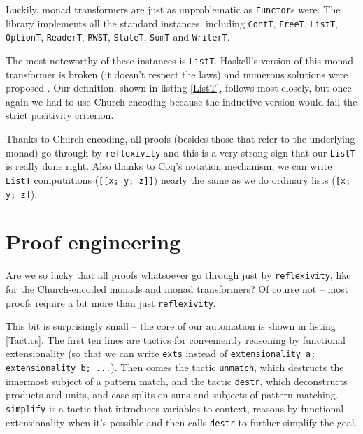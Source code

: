 \documentclass[declaration,inz,english,shortabstract]{iithesis}
\newcommand{\m}[1]{\texttt{#1}}
\begin{document}
Luckily, monad transformers are just as unproblematic as \m{Functor}s were. The library implements all the standard instances, including \m{ContT}, \m{FreeT}, \m{ListT}, \m{OptionT}, \m{ReaderT}, \m{RWST}, \m{StateT}, \m{SumT} and \m{WriterT}.


The most noteworthy of these instances is \m{ListT}. Haskell's version of this monad transformer is broken (it doesn't respect the laws) and numerous solutions were proposed \cite{ListT1} \cite{ListT2} \cite{ListT3}. Our definition, shown in listing \ref{ListT}, follows \cite{ListT1} most closely, but once again we had to use Church encoding because the inductive version would fail the strict positivity criterion.

Thanks to Church encoding, all proofs (besides those that refer to the underlying monad) go through by \m{reflexivity} and this is a very strong sign that our \m{ListT} is really done right. Also thanks to Coq's notation mechanism, we can write \m{ListT} computations (\m{[[x; y; z]]}) nearly the same as we do ordinary lists (\m{[x; y; z]}).

\section{Proof engineering}

Are we so lucky that all proofs whatsoever go through just by \m{reflexivity}, like for the Church-encoded monads and monad transformers? Of course not -- most proofs require a bit more than just \m{reflexivity}.

This bit is surprisingly small -- the core of our automation is shown in listing \ref{Tactics}. The first ten lines are tactics for conveniently reasoning by functional extensionality (so that we can write \m{exts} instead of \m{extensionality a; extensionality b; ...}). Then comes the tactic \m{unmatch}, which destructs the innermost subject of a pattern match, and the tactic \m{destr}, which deconstructs products and units, and case splits on suns and subjects of pattern matching. \m{simplify} is a tactic that introduces variables to context, reasons by functional extensionality when it's possible and then calls \m{destr} to further simplify the goal.
\end{document}
